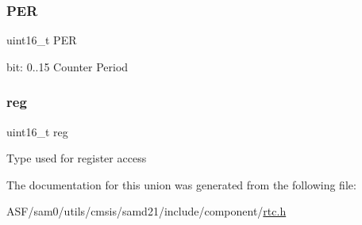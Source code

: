 \subsubsection{\texorpdfstring{PER}{PER}}
{\footnotesize\ttfamily uint16\+\_\+t P\+ER}

bit\+: 0..15 Counter Period \mbox{\label{union_r_t_c___m_o_d_e1___p_e_r___type_a11760f5020019f4aa8cb02e694f7cc44}} 
\subsubsection{\texorpdfstring{reg}{reg}}
{\footnotesize\ttfamily uint16\+\_\+t reg}

Type used for register access 

The documentation for this union was generated from the following file\+:\begin{DoxyCompactItemize}
\item 
A\+S\+F/sam0/utils/cmsis/samd21/include/component/\mbox{\hyperlink{component_2rtc_8h}{rtc.\+h}}\end{DoxyCompactItemize}
